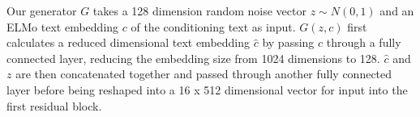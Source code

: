 Our generator $G$ takes a 128 dimension random noise vector $z \sim N(0, 1)$ and an ELMo text embedding $c$ of the conditioning text as input. $G(z, c)$ first calculates a reduced dimensional text embedding $\hat{c}$ by passing $c$ through a fully connected layer, reducing the embedding size from 1024 dimensions to 128. $\hat{c}$ and $z$ are then concatenated together and passed through another fully connected layer before being reshaped into a 16 x 512 dimensional vector for input into the first residual block. 